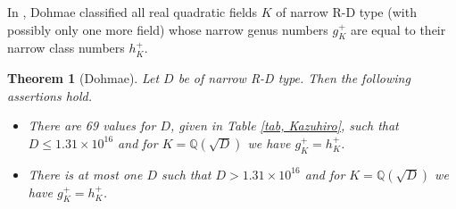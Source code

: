 \documentclass[12pt]{amsart}
\newtheorem{theorem}{Theorem}[section]
\theoremstyle{definition}
\numberwithin{equation}{section}
\begin{document}
In \cite{Kazuhiro}, Dohmae classified all real quadratic fields $K$ of narrow R-D type (with possibly only one more field) whose narrow genus numbers $g_K^+$ are equal to their narrow class numbers $h_K^+$.



\begin{theorem} [{Dohmae}]  
	\label{theorem, Kazuhiro0}
	Let $D$ be of narrow R-D type. Then the following assertions hold.
	\begin{itemize} 
		\item[(i)] There are 69 values for $D$, given in Table \ref{tab, Kazuhiro}, such that $D \leq 1.31 \times 10^{16}$ and for $K=\mathbb{Q}(\sqrt{D})$ we have $g_K^+=h_K^+$. 	
		\item[(ii)]  There is at most one $D$ such that $D> 1.31 \times 10^{16}$ and for $K=\mathbb{Q}(\sqrt{D})$ we have $g_K^+=h_K^+$.
	\end{itemize}
\end{theorem}
\end{document}

